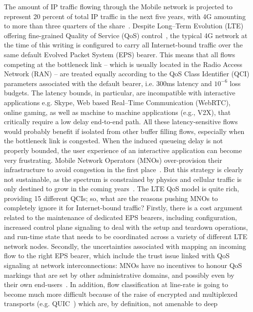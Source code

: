 \documentclass[12pt]{article}
\begin{document}
The amount of IP traffic flowing through the Mobile network is projected to
represent 20 percent of total IP traffic in the next five years, with 4G
amounting to more than three quarters of the share~\cite{cisco-forecast}.
Despite Long–Term Evolution (LTE) offering fine-grained Quality of Service
(QoS) control~\cite{3GPP-TS-23.203}, the typical 4G network at the time of this
writing is configured to carry all Internet-bound traffic over the same default
Evolved Packet System (EPS) bearer.  This means that all flows competing at the
bottleneck link -- which is usually located in the Radio Access Network (RAN)
-- are treated equally according to the QoS Class Identifier (QCI) parameters
associated with the default bearer, i.e. 300ms latency and $10^{-6}$ loss
budgets.  The latency bounds, in particular, are incompatible with interactive
applications e.g. Skype, Web based Real–Time Communication (WebRTC), online
gaming, as well as machine to machine applications (e.g., V2X),  that
critically require a low delay end-to-end path.  All these latency-sensitive
flows would probably benefit if isolated from other buffer filling flows,
especially when the bottleneck link is congested. When the induced queueing
delay is not properly bounded, the user experience of an interactive
application can become very frustrating.  Mobile Network Operators (MNOs)
over-provision their infrastructure to avoid congestion in the first
place~\cite{Martin-Geddes-2014}. But this strategy is clearly not sustainable,
as the spectrum is constrained by physics and cellular traffic is only destined
to grow in the coming years~\cite{cisco-forecast}.  The LTE QoS model is quite
rich, providing 15 different QCIs; so, what are the reasons pushing MNOs to
completely ignore it for Internet-bound traffic? Firstly, there is a cost
argument related to the maintenance of dedicated EPS bearers, including
configuration, increased control plane signaling to deal with the setup and
teardown operations, and run-time state that needs to be coordinated across a
variety of different LTE network nodes.  Secondly, the uncertainties associated
with mapping an incoming flow to the right EPS bearer, which include the trust
issue linked with QoS signaling at network interconnections: MNOs have no
incentives to honour QoS markings that are set by other administrative domains,
and possibly even by their own end-users~\cite{claffy2015}. In addition, flow
classification at line-rate is going to become much more difficult because of
the raise of encrypted and multiplexed transports (e.g.
QUIC~\cite{ietf-quic-transport}) which are, by definition, not amenable to deep
\end{document}
